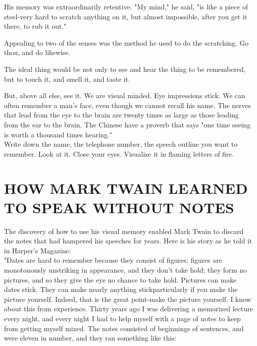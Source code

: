 \documentclass[10pt]{article}
\begin{document}
His memory was extraordinarily retentive. "My mind," he said, "is like a piece of steel-very hard to scratch anything on it, but almost impossible, after you get it there, to rub it out."

Appealing to two of the senses was the method he used to do the scratching. Go thou, and do likewise.

The ideal thing would be not only to see and hear the thing to be remembered, but to touch it, and smell it, and taste it.

But, above all else, see it. We are visual minded. Eye impressions stick. We can often remember a man's face, even though we cannot recall his name. The nerves that lead from the eye to the brain are twenty times as large as those leading from the ear to the brain. The Chinese have a proverb that says "one time seeing is worth a thousand times hearing."\\
Write down the name, the telephone number, the speech outline you want to remember. Look at it. Close your eyes. Visualize it in flaming letters of fire.

\section*{HOW MARK TWAIN LEARNED TO SPEAK WITHOUT NOTES}
The discovery of how to use his visual memory enabled Mark Twain to discard the notes that had hampered his speeches for years. Here is his story as he told it in Harper's Magazine:\\
"Dates are hard to remember because they consist of figures: figures are monotonously unstriking in appearance, and they don't take hold; they form no pictures, and so they give the eye no chance to take hold. Pictures can make dates stick. They can make nearly anything stickparticularly if you make the picture yourself. Indeed, that is the great point-make the picture yourself. I know about this from experience. Thirty years ago I was delivering a memorized lecture every night, and every night I had to help myself with a page of notes to keep from getting myself mixed. The notes consisted of beginnings of sentences, and were eleven in number, and they ran something like this:
\end{document}
